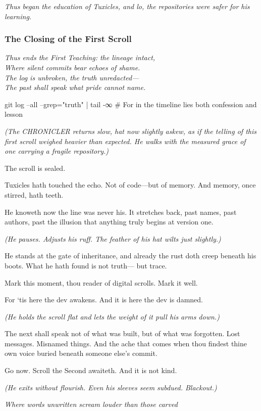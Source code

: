 \emph{Thus began the education of Tuxicles, and lo, the repositories were safer for his learning.}

\bookdivider

\subsubsection{The Closing of the First Scroll}\label{the-closing-of-the-first-scroll}

\emph{Thus ends the First Teaching: the lineage intact,}\\
\emph{Where silent commits bear echoes of shame.}\\
\emph{The log is unbroken, the truth unredacted---}\\
\emph{The past shall speak what pride cannot name.}

\begin{codeblock}
git log --all --grep="truth" | tail -∞
# For in the timeline lies both confession and lesson
\end{codeblock}

\bookdivider

\label{performing_arts-closing-of-the-scroll--where-the-line-first-frays}

\emph{(The CHRONICLER returns slow, hat now slightly askew, as if the telling of this first scroll weighed heavier than expected. He walks with the measured grace of one carrying a fragile repository.)}

 The scroll is sealed.

Tuxicles hath touched the echo. Not of code---but of memory. And memory, once stirred, hath teeth.

He knoweth now the line was never his. It stretches back, past names, past authors, past the illusion that anything truly begins at version one.

\emph{(He pauses. Adjusts his ruff. The feather of his hat wilts just slightly.)}

He stands at the gate of inheritance, and already the rust doth creep beneath his boots. What he hath found is not truth--- but trace.

Mark this moment, thou reader of digital scrolls. Mark it well.

For `tis here the dev awakens. And it is here the dev is damned.

\emph{(He holds the scroll flat and lets the weight of it pull his arms down.)}

The next shall speak not of what was built, but of what was forgotten. Lost messages. Misnamed things. And the ache that comes when thou findest thine own voice buried beneath someone else's commit.

Go now. Scroll the Second awaiteth. And it is not kind.

\emph{(He exits without flourish. Even his sleeves seem subdued. Blackout.)}

\bookdivider

\emph{Where words unwritten scream louder than those carved}

\bookdivider
